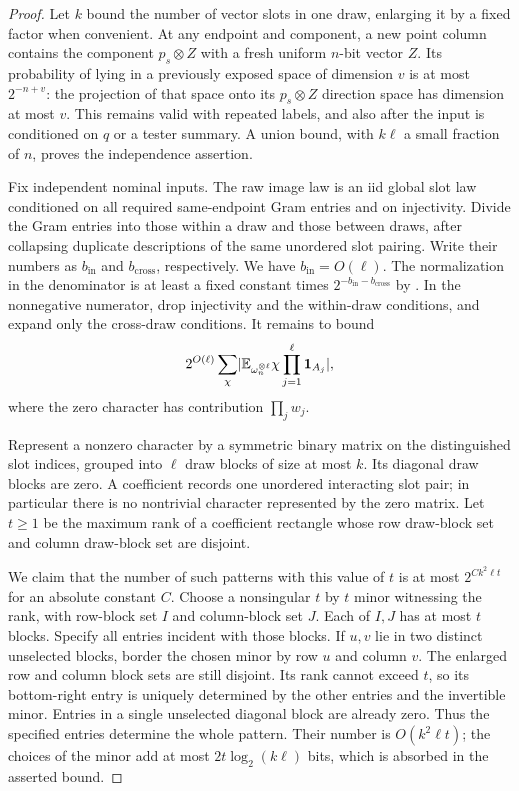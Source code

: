 \begin{proof}
Let $k$ bound the number of vector slots in one draw, enlarging it by a
fixed factor when convenient. At any endpoint and component, a new
point column contains the component $p_s\otimes Z$ with a fresh uniform
$n$-bit vector $Z$. Its probability of lying in a previously exposed
space of dimension $v$ is at most $2^{-n+v}$: the projection of that
space onto its $p_s\otimes Z$ direction space has dimension at most
$v$. This remains valid with repeated labels, and also after the input
is conditioned on $q$ or a tester summary. A union bound, with
$k\ell$ a small fraction of $n$, proves the independence assertion.

Fix independent nominal inputs. The raw image law is an iid global
slot law conditioned on all required same-endpoint Gram entries and
on injectivity. Divide the Gram entries into those within a draw and
those between draws, after collapsing duplicate descriptions of the
same unordered slot pairing. Write their numbers as $b_{\mathrm{in}}$
and $b_{\mathrm{cross}}$, respectively.
We have $b_{\mathrm{in}}=O(\ell)$. The normalization in the denominator
is at least a fixed constant times
$2^{-b_{\mathrm{in}}-b_{\mathrm{cross}}}$ by
. In the nonnegative numerator,
drop injectivity and the within-draw conditions, and expand only the
cross-draw conditions. It remains to bound
\[
 2^{O(\ell)}\sum_{\chi}
 \lvert \mathbb E_{\omega_n^{\otimes\ell}}
          \chi\prod_{j=1}^{\ell}\mathbf 1_{A_j}\rvert,
\]
where the zero character has contribution $\prod_jw_j$.

Represent a nonzero character by a symmetric binary matrix on the
distinguished slot indices, grouped into $\ell$ draw blocks of size
at most $k$. Its diagonal draw blocks are zero. A coefficient records
one unordered interacting slot pair; in particular there is no
nontrivial character represented by the zero matrix. Let $t\ge1$ be
the maximum rank of a coefficient rectangle whose row draw-block set
and column draw-block set are disjoint.

We claim that the number of such patterns with this value of $t$ is at
most $2^{Ck^2\ell t}$ for an absolute constant $C$. Choose a nonsingular
$t$ by $t$ minor witnessing the rank, with row-block set $I$ and
column-block set $J$. Each of $I,J$ has at most $t$ blocks. Specify all
entries incident with those blocks. If $u,v$ lie in two distinct
unselected blocks, border the chosen minor by row $u$ and column $v$.
The enlarged row and column block sets are still disjoint. Its rank
cannot exceed $t$, so its bottom-right entry is uniquely determined by
the other entries and the invertible minor. Entries in a single
unselected diagonal block are already zero. Thus the specified entries
determine the whole pattern. Their number is $O(k^2\ell t)$; the choices
of the minor add at most $2t\log_2(k\ell)$ bits, which is absorbed in
the asserted bound.


\end{proof}
